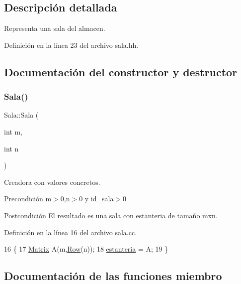 \subsection{Descripción detallada}
Representa una sala del almacen. 

Definición en la línea 23 del archivo sala.\+hh.



\subsection{Documentación del constructor y destructor}
\mbox{\label{class_sala_a7b265bb95493f0c161e6403f7295a084}} 
\subsubsection{\texorpdfstring{Sala()}{Sala()}}
{\footnotesize\ttfamily Sala\+::\+Sala (\begin{DoxyParamCaption}\item[{int}]{m,  }\item[{int}]{n }\end{DoxyParamCaption})}



Creadora con valores concretos. 

\begin{DoxyPrecond}{Precondición}
m$>$0,n$>$0 y id\+\_\+sala$>$0 
\end{DoxyPrecond}
\begin{DoxyPostcond}{Postcondición}
El resultado es una sala con estanteria de tamaño mxn. 
\end{DoxyPostcond}


Definición en la línea 16 del archivo sala.\+cc.


\begin{DoxyCode}
16                        \{
17     \mbox{\hyperlink{almacen_8hh_acdf2b2dca71b1d617c96d1afa6a525fa}{Matrix}} A(m,\mbox{\hyperlink{sala_8hh_aa33775a3e721e5fbd17b48a94ed3ca94}{Row}}(n));
18     \mbox{\hyperlink{class_sala_a8f5264818c98db9c0d075c51a7672d95}{estanteria}} = A;
19 \}
\end{DoxyCode}


\subsection{Documentación de las funciones miembro}
\mbox{\label{class_sala_a610a42c817c28d95367063d09b0a5731}} 
